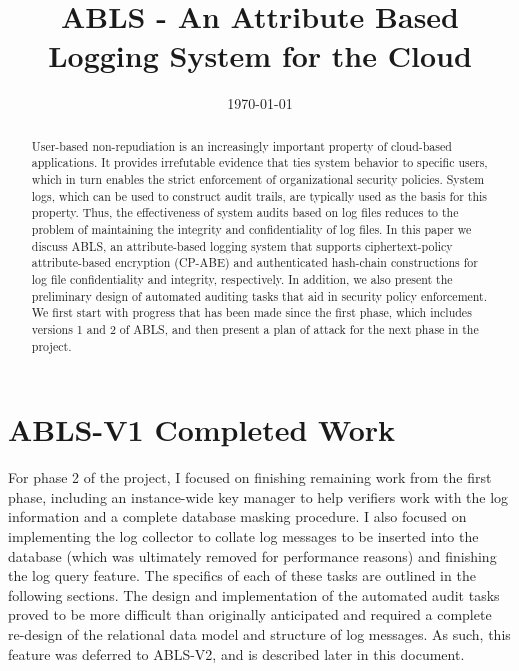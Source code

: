 \documentclass{sig-alternate}
\begin{document}
\title{ABLS - An Attribute Based Logging System for the Cloud}
\author{
}
\date{\today}
\maketitle
\begin{abstract}
User-based non-repudiation is an increasingly important property of cloud-based applications. It provides irrefutable evidence that ties system behavior to specific users, which in turn enables the strict enforcement of organizational security policies. System logs, which can be used to construct audit trails, are typically used as the basis for this property. Thus, the effectiveness of system audits based on log files reduces to the problem of maintaining the integrity and confidentiality of log files. In this paper we discuss ABLS, an attribute-based logging system that supports ciphertext-policy 
attribute-based encryption (CP-ABE) \cite{Bethencourt2007-CPABE} and authenticated hash-chain 
constructions for log file confidentiality and integrity, respectively. In addition, we also present the 
preliminary design of automated auditing tasks that aid in security policy enforcement. We first start with 
progress that has been made since the first phase, which includes versions
1 and 2 of ABLS, and then present a plan of attack for the next phase in the project. 
\end{abstract}

\section{ABLS-V1 Completed Work}

For phase 2 of the project, I focused on finishing remaining work from the first phase, including an instance-wide
key manager to help verifiers work with the log information and a complete database masking procedure. I also
focused on implementing the log collector to collate log messages to be inserted into the database (which was ultimately removed for performance
reasons) and finishing the log query feature. The specifics of each of these tasks are outlined in the 
following sections. The design and implementation of 
the automated audit tasks proved to be more difficult than originally anticipated and required a complete re-design of 
the relational data model and structure of log messages. As such, this feature was deferred to ABLS-V2, and is described 
later in this document.
\end{document}
